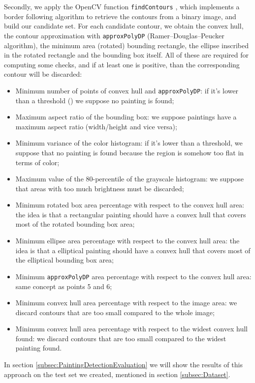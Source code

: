 \documentclass[10pt,twocolumn,letterpaper]{article}
\begin{document}
Secondly, we apply the OpenCV function \texttt{findContours} \cite{journals/cvgip/SuzukiA85}, which implements a border following algorithm to retrieve the contours from a binary image, and build our candidate set.
For each candidate contour, we obtain the convex hull, the contour approximation with \texttt{approxPolyDP} (Ramer–Douglas–Peucker algorithm), the minimum area (rotated) bounding rectangle, the ellipse inscribed in the rotated rectangle and the bounding box itself. All of these are required for computing some checks, and if at least one is positive, than the corresponding contour will be discarded:
\begin{itemize}
    \item Minimum number of points of convex hull and \texttt{approxPolyDP}: if it's lower than a threshold () we suppose no painting is found;
    \item Maximum aspect ratio of the bounding box: we suppose paintings have a maximum aspect ratio (width/height and vice versa); 
    \item Minimum variance of the color histogram: if it's lower than a threshold, we suppose that no painting is found because the region is somehow too flat in terms of color;
    \item Maximum value of the 80-percentile of the grayscale histogram: we suppose that areas with too much brightness must be discarded;
    \item Minimum rotated box area percentage with respect to the convex hull area: the idea is that a rectangular painting should have a convex hull that covers most of the rotated bounding box area;
    \item Minimum ellipse area percentage with respect to the convex hull area: the idea is that a elliptical painting should have a convex hull that covers most of the elliptical bounding box area;
    \item Minimum \texttt{approxPolyDP} area percentage with respect to the convex hull area: same concept as points 5 and 6;
    \item Minimum convex hull area percentage with respect to the image area: we discard contours that are too small compared to the whole image;
    \item Minimum convex hull area percentage with respect to the widest convex hull found: we discard contours that are too small compared to the widest painting found.
\end{itemize}

In section \ref{subsec:PaintingDetectionEvaluation} we will show the results of this approach on the test set we created, mentioned in section \ref{subsec:Dataset}.
\end{document}
